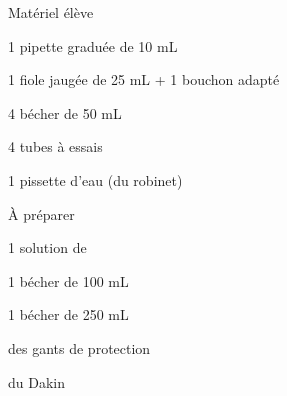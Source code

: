
\vspace*{-24pt}
\begin{boiteMateriel}{Matériel élève}
  \effectifSeconde

  \begin{protocole}
    \item 1 pipette graduée de 10 mL
    \item 1 fiole jaugée de 25 mL + 1 bouchon adapté
    \item 4 bécher de 50 mL
    \item 4 tubes à essais
    \item 1 pissette d'eau (du robinet)
  \end{protocole}
\end{boiteMateriel}


\begin{boiteMateriel}{À préparer}
  \vspace*{4pt}
  \begin{protocole}[2]
    \item 1 solution de 
    \item 1 bécher de 100 mL
    \item 1 bécher de 250 mL
    \item des gants de protection
    \item du Dakin
  \end{protocole}
\end{boiteMateriel}
